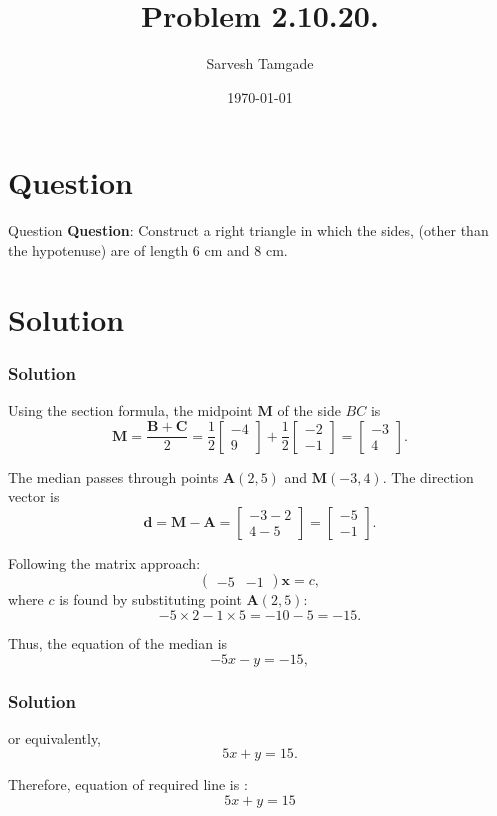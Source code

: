\documentclass{beamer}
\title{Problem 2.10.20.}
\author{Sarvesh Tamgade}
\date{\today}
\theoremstyle{remark}
\numberwithin{equation}{section}
\begin{document}
\begin{frame}
\titlepage
\end{frame}

\section{Question}
\begin{frame}{Question}
\textbf{Question}:
 Construct a right triangle in which the sides, (other than the hypotenuse) are of length 6 cm and 8 cm.
\end{frame}

\section{Solution}
\begin{frame}[fragile]
    \frametitle{Solution}
Using the section formula, the midpoint \(\mathbf{M}\) of the side \(BC\) is 
\[
\mathbf{M} = \frac{\mathbf{B} + \mathbf{C}}{2} = 
\frac{1}{2} \begin{bmatrix} -4 \\ 9 \end{bmatrix} + 
\frac{1}{2} \begin{bmatrix} -2 \\ -1 \end{bmatrix} = 
\begin{bmatrix} -3 \\ 4 \end{bmatrix}.
\]

The median passes through points \(\mathbf{A}(2,5)\) and \(\mathbf{M}(-3,4)\). The direction vector is 
\[
\mathbf{d} = \mathbf{M} - \mathbf{A} = \begin{bmatrix} -3 - 2 \\ 4 - 5 \end{bmatrix} = \begin{bmatrix} -5 \\ -1 \end{bmatrix}.
\]

Following the matrix approach:
\[
\left( \begin{array}{cc} -5 & -1 \end{array} \right) \mathbf{x} = c,
\]
where \(c\) is found by substituting point \(\mathbf{A}(2,5)\):
\[
-5 \times 2 - 1 \times 5 = -10 - 5 = -15.
\]

Thus, the equation of the median is
\[
-5 x - y = -15,
\]



\end{frame}
\begin{frame}[fragile]
    \frametitle{Solution}
or equivalently,
\[
5x + y = 15.
\]

Therefore, equation of required line is  :\[
\boxed{5x + y = 15}
\]



\end{frame}
\end{document}
